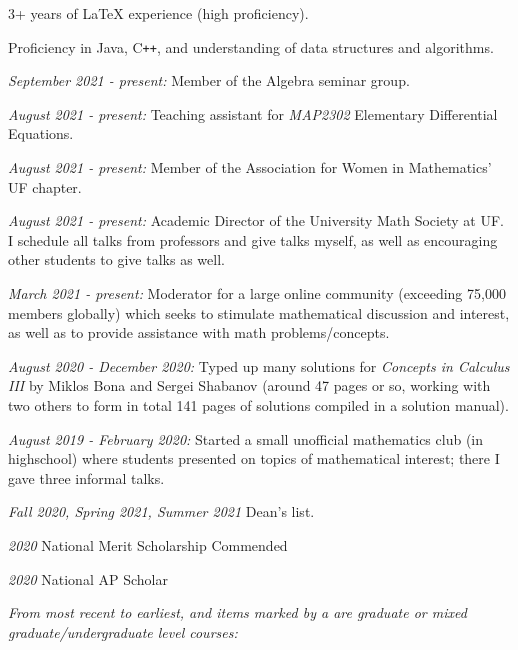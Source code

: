 \documentclass[11pt]{article}
\begin{document}

\noindent{}

3+ years of \LaTeX\hspace{1pt} experience (high proficiency).

Proficiency in Java, C\verb!++!, and understanding of data structures and algorithms. 

\noindent{}


\textsl{September 2021 - present:} Member of the Algebra seminar group.

\textsl{August 2021 - present:} Teaching assistant for \textsl{MAP2302} Elementary Differential Equations.

\textsl{August 2021 - present:} Member of the Association for Women in Mathematics' UF chapter.

\textsl{August 2021 - present:} Academic Director of the University Math Society at UF. I schedule all talks from professors and give talks myself, as well as encouraging other students to give talks as well.

\textsl{March 2021 - present:} Moderator for a large online community (exceeding 75,000 members globally) which seeks to stimulate mathematical discussion and interest, as well as to provide assistance with math problems/concepts.

\textsl{August 2020 - December 2020:} Typed up many solutions for \textsl{Concepts in Calculus
III} by Miklos Bona and Sergei Shabanov (around 47 pages or so, working with two others to form in total 141 pages of solutions compiled in a solution manual).

\textsl{August 2019 - February 2020:} Started a small unofficial mathematics club (in highschool) where students presented on topics of mathematical interest; there I gave three informal talks.

\noindent{}

\textsl{Fall 2020, Spring 2021, Summer 2021} Dean's list.

\textsl{2020} National Merit Scholarship Commended

\textsl{2020} National AP Scholar

\noindent{}

\textsl{From most recent to earliest, and items marked by a \textsuperscript{\textdagger} are graduate or mixed graduate/undergraduate level courses:}
\end{document}
